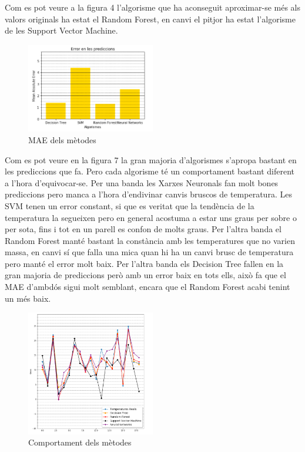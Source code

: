 \documentclass[10pt,a4paper,twocolumn,twoside]{article}
\begin{document}
Com es pot veure a la figura 4 l'algorisme que ha aconseguit aproximar-se més als valors originals ha estat el Random Forest, en canvi el pitjor ha estat l'algorisme de les Support Vector Machine.
\begin{figure}[!h]
\centering
	\includegraphics[width=0.5\textwidth]{../img/comparacioMetricsAlgs}
	\caption{MAE dels mètodes}
	\label{fig-Metrics}
\end{figure}

Com es pot veure en la figura 7 la gran majoria d'algorismes s'apropa bastant en les prediccions que fa. Pero cada algorisme té un comportament bastant diferent a l'hora d'equivocar-se. Per una banda les Xarxes Neuronals fan molt bones prediccions pero manca a l'hora d'endivinar canvis bruscos de temperatura. Les SVM tenen un error constant, si que es veritat que la tendència de la temperatura la segueixen pero en general acostuma a estar uns graus per sobre o per sota, fins i tot en un parell es confon de molts graus.
Per l'altra banda el Random Forest manté bastant la constància amb les temperatures que no varien massa, en canvi sí que falla una mica quan hi ha un canvi brusc de temperatura pero manté el error molt baix. Per l'altra banda els Decision Tree fallen en la gran majoria de prediccions però amb un error baix en tots ells, això fa que el MAE d'ambdós sigui molt semblant, encara que el Random Forest acabi tenint un més baix.

\begin{figure}[!h]
\centering
	\includegraphics[width=0.5\textwidth]{../img/comparacioAlgs}
	\caption{Comportament dels mètodes}
	\label{fig-temps}
\end{figure}
\end{document}

